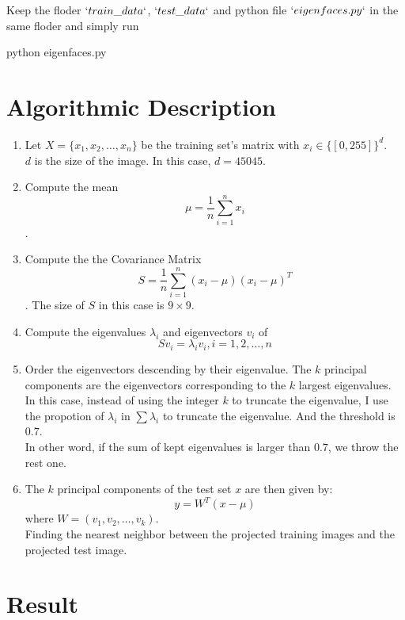 \documentclass[letterpaper]{polythesis}
\begin{document}
Keep the floder $`train\_data`$, $`test\_data`$ and python file $`eigenfaces.py`$
in the same floder and simply run

\begin{python}
python eigenfaces.py
\end{python}

\chapter{Algorithmic Description}
\label{ch-2}

\begin{enumerate}[step 1]
\item Let $X = \{ x_{1}, x_{2}, \ldots, x_{n} \}$ be the
      training set's matrix with $x_i \in \{[0, 255]\}^{d}$.\\
      $d$ is the size of the image. In this case, $d = 45045$.
\item Compute the mean $$\mu = \frac{1}{n} \sum_{i=1}^{n} x_{i}$$.
\item Compute the the Covariance Matrix
      $$S = \frac{1}{n} \sum_{i=1}^{n} (x_{i} - \mu) (x_{i} - \mu)^T$$.
      The size of $S$ in this case is $9\times 9$.
\item Compute the eigenvalues $\lambda_{i}$ and eigenvectors $v_{i}$ of $$
S v_{i} = \lambda_{i} v_{i}, i=1,2,\ldots,n$$
\item Order the eigenvectors descending by their eigenvalue.
      The $k$ principal components are the eigenvectors corresponding to
      the $k$ largest eigenvalues. \\
      In this case, instead of using the integer $k$ to truncate the eigenvalue,
      I use the propotion of $\lambda_i$ in $\sum \lambda_i$ to truncate the
      eigenvalue. And the threshold is $0.7$. \\
      In other word, if the sum of kept eigenvalues is larger than $0.7$, we throw
      the rest one.
\item The $k$ principal components of the test set $x$ are then given by:
      $$y = W^{T} (x - \mu)$$
      where $W = (v_{1}, v_{2}, \ldots, v_{k})$.\\
      Finding the nearest neighbor between the projected training images and
      the projected test image.
\end{enumerate}

\chapter{Result}
\label{ch-3}
\end{document}
